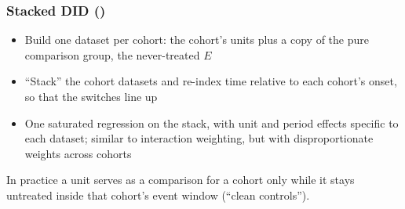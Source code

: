 \documentclass[xcolor=svgnames,9pt,english, aspectratio=169]{beamer}
\newcommand{\gcell}[3]{\fill[#3] ({#1-1},{5-#2}) rectangle ({#1},{6-#2});}
\newcommand{\basegrid}{%
  \fill[cellC] (0,0) rectangle (6,5);
  \foreach \c in {3,...,6} {\gcell{\c}{1}{cellT}\gcell{\c}{2}{cellT}}
  \foreach \c in {5,6} {\gcell{\c}{3}{cellT}}
  \gcell{6}{4}{cellT}}
\newcommand{\gridframe}{%
  \draw[white, very thin] (0,0) grid (6,5);
  \draw[gray!60, thin] (0,0) rectangle (6,5);
  \foreach \r/\l in {1/A,2/B,3/C,4/D,5/E} {\node[left=2pt] at (0,{5.5-\r}) {\small \l};}
  \foreach \c in {1,...,6} {\node[below=2pt] at ({\c-0.5},0) {\small \c};}}
\newcommand{\cblock}[4]{%
  \fill[cellC] (#1,#2) rectangle ({#1+6},{#2+#3+1});
  \fill[cellT] ({#1+#4-1},{#2+1}) rectangle ({#1+6},{#2+#3+1});
  \draw[white, very thin] (#1,#2) grid ({#1+6},{#2+#3+1});
  \draw[gray!60, thin] (#1,#2) rectangle ({#1+6},{#2+#3+1});}
\begin{document}
\begin{frame}[t]
  \frametitle{Stacked DID (\cite{cengiz2019effect})}
\begin{itemize}\itemsep0.4em
\item<1-> Build one dataset per cohort: the cohort's units plus \alert{a copy of the pure comparison group}, the never-treated $E$
\item<2-> ``Stack'' the cohort datasets and re-index time relative to each cohort's onset, so that the switches line up
\item<3-> One saturated regression on the stack, with unit and period effects specific to each dataset; similar to interaction weighting, but with disproportionate weights across cohorts
\end{itemize}
\begin{center}
\end{center}
\vspace{-1em}
{\scriptsize In practice a unit serves as a comparison for a cohort only while it stays untreated inside that cohort's event window (``clean controls'').}
\end{frame}
\end{document}
